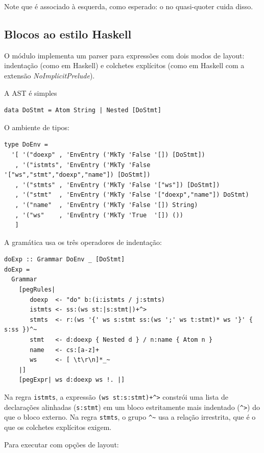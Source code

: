 Note que  é associado à esquerda, como esperado: o
 no quasi-quoter cuida disso.

\subsection{Blocos ao estilo Haskell}

O módulo  implementa um parser para
expressões  com dois modos de layout: indentação (como em
Haskell) e colchetes explícitos (como em Haskell com a extensão
\emph{NoImplicitPrelude}).

A AST é simples

\begin{verbatim}
data DoStmt = Atom String | Nested [DoStmt]
\end{verbatim}

O ambiente de tipos:

\begin{verbatim}
type DoEnv =
  '[ '("doexp" , 'EnvEntry ('MkTy 'False '[]) [DoStmt])
   , '("istmts", 'EnvEntry ('MkTy 'False '["ws","stmt","doexp","name"]) [DoStmt])
   , '("stmts" , 'EnvEntry ('MkTy 'False '["ws"]) [DoStmt])
   , '("stmt"  , 'EnvEntry ('MkTy 'False '["doexp","name"]) DoStmt)
   , '("name"  , 'EnvEntry ('MkTy 'False '[]) String)
   , '("ws"    , 'EnvEntry ('MkTy 'True  '[]) ())
   ]
\end{verbatim}

A gramática usa os três operadores de indentação:

\begin{verbatim}
doExp :: Grammar DoEnv _ [DoStmt]
doExp =
  Grammar
    [pegRules|
       doexp  <- "do" b:(i:istmts / j:stmts)
       istmts <- ss:(ws st:|s:stmt|)+^>
       stmts  <- r:(ws '{' ws s:stmt ss:(ws ';' ws t:stmt)* ws '}' { s:ss })^~
       stmt   <- d:doexp { Nested d } / n:name { Atom n }
       name   <- cs:[a-z]+
       ws     <- [ \t\r\n]*_~
    |]
    [pegExpr| ws d:doexp ws !. |]
\end{verbatim}

Na regra \texttt{istmts}, a expressão
\texttt{(ws st:{\textbar}s:stmt{\textbar})+\^{}>}
constrói uma lista de declarações alinhadas (\texttt{{\textbar}s:stmt{\textbar}})
em um bloco estritamente mais indentado (\texttt{\^{}>}) do que o bloco externo.
Na regra \texttt{stmts}, o grupo \texttt{\^{}\~{}} usa a relação irrestrita,
que é o que os colchetes explícitos exigem.

Para executar com opções de layout:

